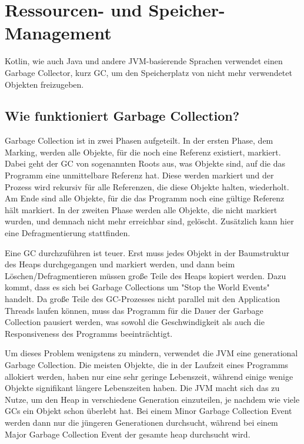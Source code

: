 
\section{Ressourcen- und Speicher-Management}\label{sec:resourcenmanagement}

\renewcommand{\kapitelautor}{Autor: Marvin Kurka}

Kotlin, wie auch Java und andere JVM-basierende Sprachen verwendet einen Garbage Collector, kurz GC, um den
Speicherplatz von nicht mehr verwendetet Objekten freizugeben.\cite{oracleGC}

\subsection{Wie funktioniert Garbage Collection?}

Garbage Collection ist in zwei Phasen aufgeteilt.
In der ersten Phase, dem Marking, werden alle Objekte, für die noch eine Referenz existiert, markiert.
Dabei geht der GC von sogenannten Roots aus, was Objekte sind, auf die das Programm eine unmittelbare
Referenz hat.
Diese werden markiert und der Prozess wird rekursiv für alle Referenzen, die diese Objekte halten, wiederholt.
Am Ende sind alle Objekte, für die das Programm noch eine gültige Referenz hält markiert.
In der zweiten Phase werden alle Objekte, die nicht markiert wurden, und demnach nicht mehr erreichbar sind, gelöscht.
Zusätzlich kann hier eine Defragmentierung stattfinden.\cite{oracleGC}

Eine GC durchzuführen ist teuer.
Erst muss jedes Objekt in der Baumstruktur des Heaps durchgegangen und markiert werden, und dann beim
Löschen/Defragmentieren müssen große Teile des Heaps kopiert werden.
Dazu kommt, dass es sich bei Garbage Collections um "Stop the World Events" handelt.
Da große Teile des GC-Prozesses nicht parallel mit den Application Threads laufen können, muss das
Programm für die Dauer der Garbage Collection pausiert werden, was sowohl die Geschwindigkeit als auch die
Responsiveness des Programms beeinträchtigt.\cite{oracleGC}

Um dieses Problem wenigstens zu mindern, verwendet die JVM eine generational Garbage Collection.
Die meisten Objekte, die in der Laufzeit eines Programms allokiert werden, haben nur eine sehr geringe Lebenszeit,
während einige wenige Objekte signifikant längere Lebenszeiten haben.
Die JVM macht sich das zu Nutze, um den Heap in verschiedene Generation einzuteilen, je nachdem wie viele GCs
ein Objekt schon überlebt hat.
Bei einem Minor Garbage Collection Event werden dann nur die jüngeren Generationen durchsucht, während bei einem
Major Garbage Collection Event der gesamte heap durchsucht wird.\cite{oracleGC}

